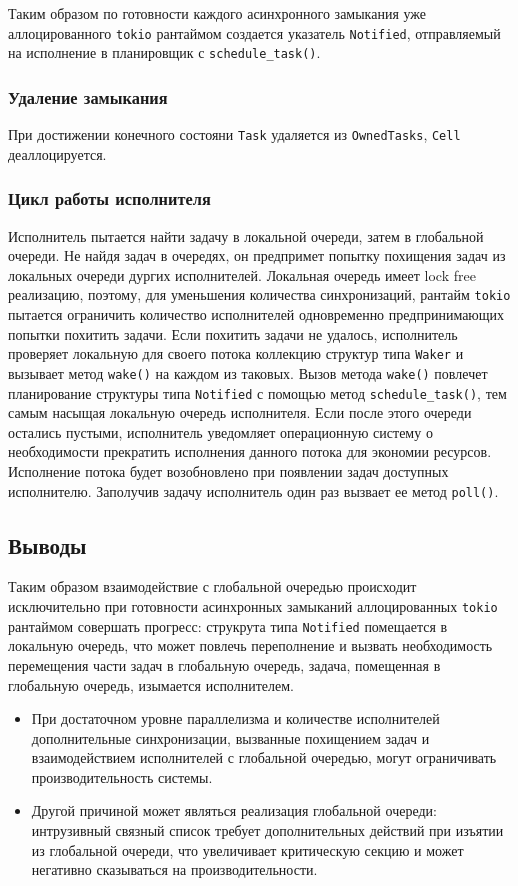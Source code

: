 Таким образом по готовности каждого асинхронного замыкания уже аллоцированного \verb|tokio| рантаймом создается указатель \verb|Notified|, отправляемый на исполнение в планировщик с \verb|schedule_task()|.

\subsubsection{Удаление замыкания}

При достижении конечного состояни \verb|Task| удаляется из \verb|OwnedTasks|, \verb|Cell| деаллоцируется.

\subsubsection{Цикл работы исполнителя}

Исполнитель пытается найти задачу в локальной очереди, затем в глобальной очереди. Не найдя задач в очередях, он предпримет попытку похищения задач из локальных очереди дургих исполнителей. Локальная очередь имеет lock free реализацию, поэтому, для уменьшения количества синхронизаций, рантайм \verb|tokio| пытается ограничить количество исполнителей одновременно предпринимающих попытки похитить задачи. Если похитить задачи не удалось, исполнитель проверяет локальную для своего потока коллекцию структур типа \verb|Waker| и вызывает метод \verb|wake()| на каждом из таковых. Вызов метода \verb|wake()| повлечет планирование структуры типа \verb|Notified| с помощью метод \verb|schedule_task()|, тем самым насыщая локальную очередь исполнителя. Если после этого очереди остались пустыми, исполнитель уведомляет операционную систему о необходимости прекратить исполнения данного потока для экономии ресурсов. Исполнение потока будет возобновлено при появлении задач доступных исполнителю. Заполучив задачу исполнитель один раз вызвает ее метод \verb|poll()|.

\subsection{Выводы}

Таким образом взаимодействие с глобальной очередью происходит исключительно при готовности асинхронных замыканий аллоцированных \verb|tokio| рантаймом совершать прогресс: струкрута типа \verb|Notified| помещается в локальную очередь, что может повлечь переполнение и вызвать необходимость перемещения части задач в глобальную очередь, задача, помещенная в глобальную очередь, изымается исполнителем.

\begin{itemize}
    \item При достаточном уровне параллелизма и количестве исполнителей дополнительные синхронизации, вызванные похищением задач и взаимодействием исполнителей с глобальной очередью, могут ограничивать производительность системы.
    \item Другой причиной может являться реализация глобальной очереди: интрузивный связный список требует дополнительных действий при изъятии из глобальной очереди, что увеличивает критическую секцию и может негативно сказываться на производительности.
\end{itemize}
